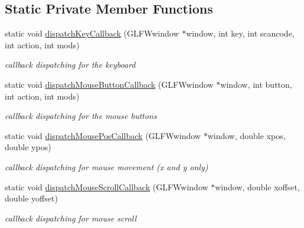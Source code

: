 \subsection*{Static Private Member Functions}
\begin{DoxyCompactItemize}
\item 
static void \mbox{\hyperlink{class_input_system_af0dc23d1ab45a68a0b73733240b67ddf}{dispatch\+Key\+Callback}} (G\+L\+F\+Wwindow $\ast$window, int key, int scancode, int action, int mods)
\begin{DoxyCompactList}\small\item\em callback dispatching for the keyboard \end{DoxyCompactList}\item 
static void \mbox{\hyperlink{class_input_system_ab63ca4e56f93c7272b2029f9abb68ad0}{dispatch\+Mouse\+Button\+Callback}} (G\+L\+F\+Wwindow $\ast$window, int button, int action, int mods)
\begin{DoxyCompactList}\small\item\em callback dispatching for the mouse buttons \end{DoxyCompactList}\item 
static void \mbox{\hyperlink{class_input_system_acf36cab1c6777a88af30b2afb57e31b1}{dispatch\+Mouse\+Pos\+Callback}} (G\+L\+F\+Wwindow $\ast$window, double xpos, double ypos)
\begin{DoxyCompactList}\small\item\em callback dispatching for mouse movement (x and y only) \end{DoxyCompactList}\item 
static void \mbox{\hyperlink{class_input_system_af5bbb69061e74c6ea81d17d8657304c3}{dispatch\+Mouse\+Scroll\+Callback}} (G\+L\+F\+Wwindow $\ast$window, double xoffset, double yoffset)
\begin{DoxyCompactList}\small\item\em callback dispatching for mouse scroll \end{DoxyCompactList}\end{DoxyCompactItemize}
